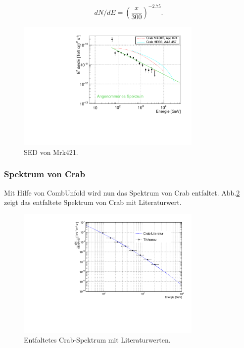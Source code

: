 \begin{equation}
dN/dE=\left(\frac{x}{300}\right)^{-2.75}.
\end{equation}


\begin{figure}
    \centering
    \includegraphics[width=0.8\textwidth]{./Plots/04_MrkAnalyse/Datenset2/SED_Mrk421.pdf}
    \caption{SED von Mrk421.}
    \label{Datenset2_SED_Mrk421}
\end{figure}


\subsubsection{Spektrum von Crab}
Mit Hilfe von CombUnfold wird nun das Spektrum von Crab entfaltet.
Abb.\ref{Datenset2_CombunFold_Crab} zeigt das entfaltete Spektrum von Crab mit Literaturwert.

\begin{figure}
    \centering
    \includegraphics[width=0.8\textwidth]{./Plots/04_MrkAnalyse/Datenset2/Crab_mit_Literatur.pdf}
    \caption{Entfaltetes Crab-Spektrum mit Literaturwerten.}
    \label{Datenset2_CombunFold_Crab}
\end{figure}

